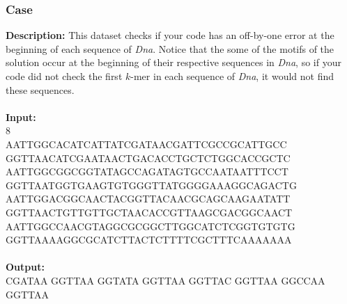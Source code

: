 \documentclass{article}
\newcommand{\code}[1]{{\fontfamily{pcr}\selectfont #1}}
\begin{document}
\subsubsection*{Case }
\hline \vspace{5}
\textbf{Description:} This dataset checks if your code has an off-by-one error at the beginning of each sequence of \emph{Dna}. Notice that the some of the motifs of the solution occur at the beginning of their respective sequences in \emph{Dna}, so if your code did not check the first $k$-mer in each sequence of \emph{Dna}, it would not find these sequences.\\ \\
\noindent \textbf{Input:}\\
\code{6 8\\AATTGGCACATCATTATCGATAACGATTCGCCGCATTGCC\\GGTTAACATCGAATAACTGACACCTGCTCTGGCACCGCTC\\AATTGGCGGCGGTATAGCCAGATAGTGCCAATAATTTCCT\\GGTTAATGGTGAAGTGTGGGTTATGGGGAAAGGCAGACTG\\AATTGGACGGCAACTACGGTTACAACGCAGCAAGAATATT\\GGTTAACTGTTGTTGCTAACACCGTTAAGCGACGGCAACT\\AATTGGCCAACGTAGGCGCGGCTTGGCATCTCGGTGTGTG\\GGTTAAAAGGCGCATCTTACTCTTTTCGCTTTCAAAAAAA }\\ \\
\noindent \textbf{Output:}\\
\code{CGATAA GGTTAA GGTATA GGTTAA GGTTAC GGTTAA GGCCAA GGTTAA}
\pagebreak
\end{document}
